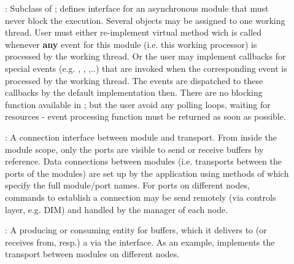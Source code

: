\begin{description}
\item[] : 
Subclass of ; defines interface for an 
   asynchronous module that must never block the execution. Several 
    objects may be assigned to one working thread. User must 
   either re-implement virtual method  wich is called 
   whenever {\bf any} event for this module (i.e. this working processor) 
   is processed by the working thread. Or the user may implement 
   callbacks for special events (e.g. , 
   , ,..) that are invoked when 
   the corresponding event is processed by the working thread. 
   The events are dispatched to these callbacks by the  
   default implementation then. There are no blocking function available in ;  
   but the user  avoid any polling loops, waiting for resources - 
   event processing function must be returned as soon as possible.

\item[] : 
A connection interface between module and transport. 
   From inside the module scope, only the ports are visible to send or  receive 
   buffers by reference. Data connections between modules 
   (i.e. transports between the ports of the modules) are set up by 
   the application using methods of  which specify the full 
   module/port names. For ports on different nodes, commands to establish 
   a connection may be send remotely (via controls layer, e.g. DIM) and 
   handled by the manager of each node.  

\item[] : 
A producing or consuming entity for buffers, which it delivers to 
(or receives from, resp.) a  via the  interface.   
As an example,  implements the transport between modules on different nodes.


\end{description}
